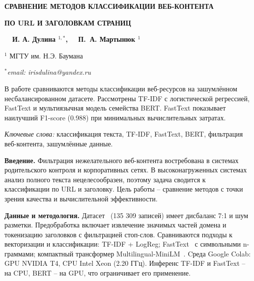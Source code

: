 \documentclass[oneside, a5paper,10pt]{article}
\begin{document}
    \pagestyle{fancy}
    \fancyhead{}\fancyfoot{}
    \cfoot{\thepage}

    \centerline{\bf СРАВНЕНИЕ МЕТОДОВ КЛАССИФИКАЦИИ ВЕБ-КОНТЕНТА} %
    \centerline{\bf ПО URL И ЗАГОЛОВКАМ СТРАНИЦ} %

    \smallskip %
    \centerline{\bf}
    \centerline{\bf \ \ И. А. Дулина $^{1,*}$,   \ \ П.~А. Мартынюк $^{1}$}
    \smallskip
    \centerline{$^{1}$ МГТУ им. Н.Э. Баумана}
    \centerline{$^{*}$\it email: irisdulina@yandex.ru}
    \bigskip %


    В работе сравниваются методы классификации веб-ресурсов на зашумлённом несбалансированном датасете. Рассмотрены TF-IDF с логистической регрессией, FastText и мультиязычная модель семейства BERT. FastText показывает наилучший F1-score (0.988) при минимальных вычислительных затратах.

    \medskip
    \textit{Ключевые слова:} классификация текста, TF-IDF,
    FastText, BERT, фильтрация веб-контента, зашумлённые данные.
    \medskip

    \noindent\textbf{Введение.}
    Фильтрация нежелательного веб-контента востребована в системах родительского контроля и корпоративных сетях. В высоконагруженных системах анализ полного текста нецелесообразен, поэтому задача сводится к классификации по URL и заголовку. Цель работы – сравнение методов с точки зрения качества и вычислительной эффективности.

    \noindent\textbf{Данные и методология.}
    Датасет~\cite{dataset} (135 309 записей) имеет дисбаланс 7:1 и шум разметки.
    Предобработка включает извлечение значимых частей домена и
    токенизацию заголовков с фильтрацией стоп-слов. Сравниваются подходы к векторизации и классификации: TF-IDF + LogReg; FastText~\cite{Joulin} с символьными
    n-граммами; компактный трансформер Multilingual-MiniLM~\cite{Wang20}. Cреда Google Colab: GPU NVIDIA T4, CPU Intel Xeon (2.20 ГГц). Инференс TF-IDF и FastText – на CPU, BERT – на GPU, что ограничивает его применение.
\end{document}
